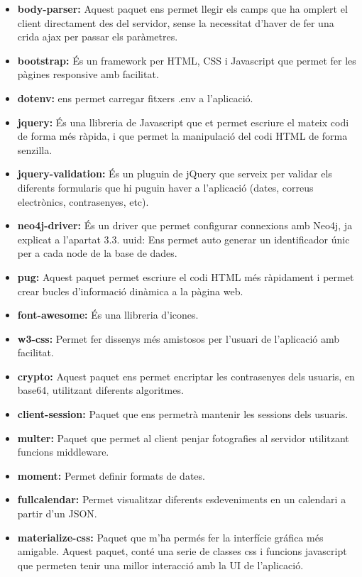 \documentclass[11pt,catalan,listoffigures,listoftables]{tfgetsinf}
\begin{document}
\begin{itemize}
\item \textbf{body-parser:} Aquest paquet ens permet llegir els camps que ha omplert el client directament des del servidor, sense la necessitat d'haver de fer una crida ajax per passar els paràmetres.
\item \textbf{bootstrap:} És un framework per HTML, CSS i Javascript que permet fer les pàgines responsive amb facilitat.
\item \textbf{dotenv:} ens permet carregar fitxers .env a l'aplicació.
\item \textbf{jquery:} És una llibreria de Javascript que et permet escriure el mateix codi de forma més ràpida, i que permet la manipulació del codi HTML de forma senzilla.
\item \textbf{jquery-validation:} És un pluguin de jQuery que serveix per validar els diferents formularis que hi puguin haver a l'aplicació (dates, correus electrònics, contrasenyes, etc).
\item \textbf{neo4j-driver:} És un driver que permet configurar connexions amb Neo4j, ja explicat a l'apartat 3.3.
uuid: Ens permet auto generar un identificador únic per a cada node de la base de dades.
\item \textbf{pug:} Aquest paquet permet escriure el codi HTML més ràpidament i permet crear bucles d'informació dinàmica a la pàgina web.
\item \textbf{font-awesome:} És una llibreria d'icones.
\item \textbf{w3-css:} Permet fer dissenys més amistosos per l'usuari de l'aplicació amb facilitat.
\item \textbf{crypto:} Aquest paquet ens permet encriptar les contrasenyes dels usuaris, en base64, utilitzant diferents algoritmes.
\item \textbf{client-session:} Paquet que ens permetrà mantenir les sessions dels usuaris.
\item \textbf{multer:} Paquet que permet al client penjar fotografies al servidor utilitzant funcions middleware.
\item \textbf{moment:} Permet definir formats de dates.
\item \textbf{fullcalendar:} Permet visualitzar diferents esdeveniments en un calendari a partir d'un JSON.
\item \textbf{materialize-css:} Paquet que m'ha permés fer la interfície gráfica més amigable. Aquest paquet, conté una serie de classes css i funcions javascript que permeten tenir una millor interacció amb la UI de l'aplicació.

\end{itemize}
\end{document}
